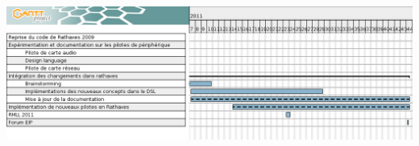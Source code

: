 \documentclass{rtxreport}
\begin{document}
\begin{landscape}
\begin{table}
\centering
{}
\includegraphics[scale=0.55]{../../gantt/ganttRathaxes_v2}
\end{table}
\end{landscape}

\rtxbibliography
\end{document}
